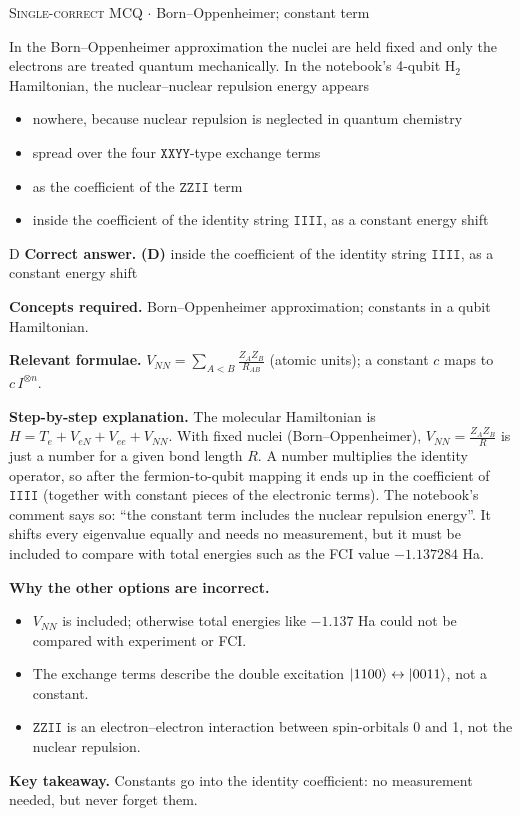 \documentclass[11pt,a4paper]{article}
\newcommand{\optlabel}[1]{\textbf{(#1)}}
\newcommand{\correctlabel}[1]{\textcolor{okgreen}{\textbf{(#1)}\,\ding{51}}}
\newenvironment{qitem}[1]{\begin{list}{}{\setlength{\leftmargin}{3.3em}\setlength{\labelwidth}{3.1em}%
  \setlength{\labelsep}{0.2em}\setlength{\topsep}{3pt}\setlength{\parsep}{3pt}}\item[\textbf{Q.#1}\hfill]}{\end{list}}
\newcommand{\qsep}{\par\vspace{2pt}{\color{black!15}\hrule}\vspace{4pt}}
\newcommand{\qmeta}[2]{{\footnotesize\color{black!60}\textsc{#1} \;$\cdot$\; #2}\par}
\begin{document}
\begin{qitem}{6}
\qmeta{Single-correct MCQ}{Born--Oppenheimer; constant term}
In the Born--Oppenheimer approximation the nuclei are held fixed and only the electrons are treated quantum mechanically. In the
notebook's 4-qubit H$_2$ Hamiltonian, the nuclear--nuclear repulsion energy appears
\begin{itemize}[leftmargin=2.6em, labelsep=0.4em, itemsep=2pt, topsep=3pt]
\item[\optlabel{A}] nowhere, because nuclear repulsion is neglected in quantum chemistry
\item[\optlabel{B}] spread over the four $\texttt{XXYY}$-type exchange terms
\item[\optlabel{C}] as the coefficient of the $\texttt{ZZII}$ term
\item[\correctlabel{D}] inside the coefficient of the identity string $\texttt{IIII}$, as a constant energy shift
\end{itemize}
\end{qitem}
\begin{solbox}{D}
\textbf{\color{brand}Correct answer.} \textcolor{okgreen}{\textbf{(D)}} inside the coefficient of the identity string $\texttt{IIII}$, as a constant energy shift

\textbf{\color{brand}Concepts required.} Born--Oppenheimer approximation; constants in a qubit Hamiltonian.

\textbf{\color{brand}Relevant formulae.} $V_{NN} = \sum_{A<B}\frac{Z_AZ_B}{R_{AB}}$ (atomic units); a constant $c$ maps to $c\,I^{\otimes n}$.

\textbf{\color{brand}Step-by-step explanation.} The molecular Hamiltonian is $H = T_e + V_{eN} + V_{ee} + V_{NN}$. With fixed nuclei (Born--Oppenheimer), $V_{NN} = \frac{Z_AZ_B}{R}$ is
just a number for a given bond length $R$. A number multiplies the identity operator, so after the fermion-to-qubit mapping it
ends up in the coefficient of $\texttt{IIII}$ (together with constant pieces of the electronic terms). The notebook's comment
says so: ``the constant term includes the nuclear repulsion energy''. It shifts every eigenvalue equally and needs no
measurement, but it must be included to compare with total energies such as the FCI value $-1.137284$ Ha.

\textbf{\color{brand}Why the other options are incorrect.}
\begin{itemize}[leftmargin=2.4em, itemsep=1pt, topsep=2pt]
\item[\textbf{(A)}] $V_{NN}$ is included; otherwise total energies like $-1.137$ Ha could not be compared with experiment or FCI.
\item[\textbf{(B)}] The exchange terms describe the double excitation $\ket{1100} \leftrightarrow \ket{0011}$, not a constant.
\item[\textbf{(C)}] $\texttt{ZZII}$ is an electron--electron interaction between spin-orbitals 0 and 1, not the nuclear repulsion.
\end{itemize}
\textbf{\color{brand}Key takeaway.} Constants go into the identity coefficient: no measurement needed, but never forget them.
\end{solbox}
\qsep
\end{document}
